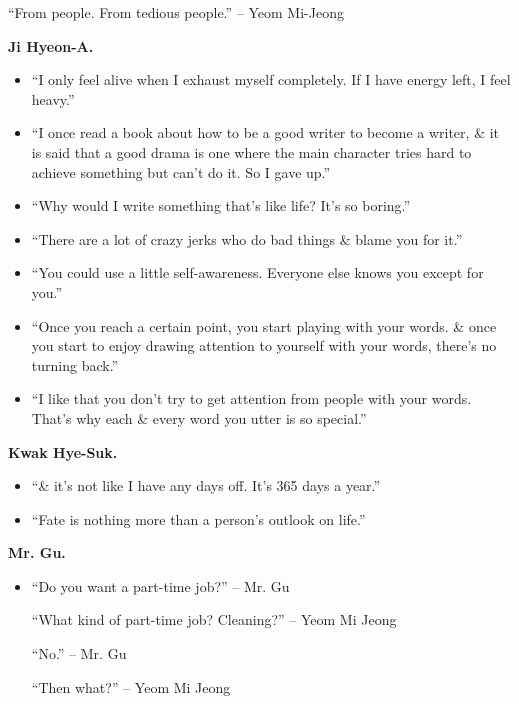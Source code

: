 \documentclass{article}
\begin{document}
\begin{enumerate}
\begin{itemize}
		``From people. From tedious people.'' -- Yeom Mi-Jeong
	\end{itemize}
	{\bf Ji Hyeon-A.}
	\begin{itemize}
		\item ``I only feel alive when I exhaust myself completely. If I have energy left, I feel heavy.''
		\item ``I once read a book about how to be a good writer to become a writer, \& it is said that a good drama is one where the main character tries hard to achieve something but can't do it. So I gave up.''
		\item ``Why would I write something that's like life? It's so boring.''
		\item ``There are a lot of crazy jerks who do bad things \& blame you for it.''
		\item ``You could use a little self-awareness. Everyone else knows you except for you.''
		\item ``Once you reach a certain point, you start playing with your words. \& once you start to enjoy drawing attention to yourself with your words, there's no turning back.''
		\item ``I like that you don't try to get attention from people with your words. That's why each \& every word you utter is so special.''
	\end{itemize}
	{\bf Kwak Hye-Suk.}
	\begin{itemize}
		\item ``\& it's not like I have any days off. It's 365 days a year.''
		\item ``Fate is nothing more than a person's outlook on life.''
	\end{itemize}
	{\bf Mr. Gu.}
	\begin{itemize}
		\item ``Do you want a part-time job?'' -- Mr. Gu

		``What kind of part-time job? Cleaning?'' -- Yeom Mi Jeong

		``No.'' -- Mr. Gu

		``Then what?'' -- Yeom Mi Jeong


\end{itemize}
\end{enumerate}
\end{document}

